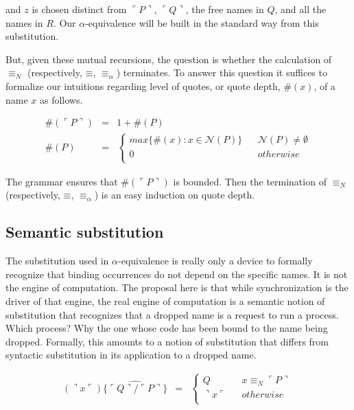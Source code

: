 \documentclass[]{amsart}
\newcommand{\lpquote}{\ulcorner}
\newcommand{\rpquote}{\urcorner}
\newcommand{\id}[1]{\texttt{#1}}
\newcommand{\scong}{\mathbin{\equiv}}
\newcommand{\nameeq}{\mathbin{\equiv_N}}
\newcommand{\alphaeq}{\mathbin{\equiv_{\alpha}}}
\newcommand{\names}[1]{\mathbin{\mathcal{N}(#1)}}
\newcommand{\quotep}[1]{\lpquote #1 \rpquote}
\newcommand{\dropn}[1]{\rpquote #1 \lpquote}
\newcommand{\substp}[2]{\id{\{} \quotep{#1} / \quotep{#2} \id{\}}}
\newcommand{\psubstp}[2]{\widehat{\substp{#1}{#2}}}
\theoremstyle{definition}
\theoremstyle{remark}
\numberwithin{equation}{subsection}
\begin{document}
and $z$ is chosen distinct from $\quotep{P}$, $\quotep{Q}$, the free
names in $Q$, and all the names in $R$. Our $\alpha$-equivalence will
be built in the standard way from this substitution.

But, given these mutual recursions, the question is whether the calculation
of $\nameeq$ (respectively, $\scong$, $\alphaeq$) terminates. To
answer this question it suffices to formalize our intuitions regarding
level of quotes, or quote depth, $\#(x)$, of a name $x$ as
follows.

\begin{eqnarray*}
	\#(\quotep{P}) & = & 1 + \#(P) \\
    \#(P) & = & \left\{
			   \begin{array}{ccc}
				 max\{ \#(x) : x \in \names{P} \} & & \names{P} \neq \emptyset \\
				 0 & & otherwise \\
			   \end{array}
			\right.
\end{eqnarray*}

The grammar ensures that $\#(\quotep{P})$ is bounded. Then the
termination of $\nameeq$ (respectively, $\scong$, $\alphaeq$) is an
easy induction on quote depth.

\subsection{Semantic substitution}

The substitution used in $\alpha$-equivalence is really only a device
to formally recognize that binding occurrences do not depend on the
specific names. It is not the engine of computation. The proposal here
is that while synchronization is the driver of that engine, the real
engine of computation is a semantic notion of substitution that
recognizes that a dropped name is a request to run a process. Which
process? Why the one whose code has been bound to the name being
dropped. Formally, this amounts to a notion of substitution that
differs from syntactic substitution in its application to a dropped
name.

\begin{eqnarray*}
(\dropn{x})  \psubstp{Q}{P}       
		& = & 
		\left\{ 
			\begin{array}{ccc} 
				Q & & x \nameeq \quotep{P} \\
                              	\dropn{x} & & otherwise \\
			\end{array}
		\right.
\end{eqnarray*}
\end{document}
